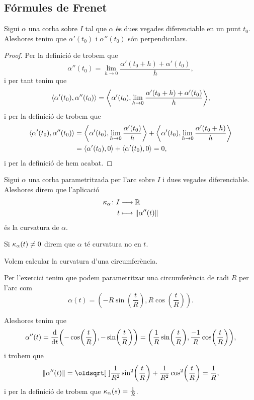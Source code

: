 \documentclass[../Apunts.tex]{subfiles}
\begin{document}
	\subsection{Fórmules de Frenet}
	\begin{proposition}
		\label{prop:la primera derivada i la segona derivada d'una corba són perpendiculars}
		Sigui \(\alpha\) una corba sobre \(I\) tal que \(\alpha\) és dues vegades diferenciable en un punt \(t_{0}\). Aleshores tenim que \(\alpha'(t_{0})\) i \(\alpha''(t_{0})\) són perpendiculars.
		\begin{proof}
			Per la definició de  trobem que
			\[\alpha''(t_{0})=\lim_{h\to0}\frac{\alpha'(t_{0}+h)+\alpha'(t_{0})}{h},\]
			i per tant tenim que
			\[\prodesc{\alpha'(t_{0})}{\alpha''(t_{0})}=\prodesc[\Big]{\alpha'(t_{0})}{\lim_{h\to0}\frac{\alpha'(t_{0}+h)+\alpha'(t_{0})}{h}},\]
			i per la definició de  trobem que
			\begin{align*}
				\prodesc{\alpha'(t_{0})}{\alpha''(t_{0})}	&=\prodesc[\big]{\alpha'(t_{0})}{\lim_{h\to0}\frac{\alpha'(t_{0})}{h}}+\prodesc[\big]{\alpha'(t_{0})}{\lim_{h\to0}\frac{\alpha'(t_{0}+h)}{h}} \\
				&=\prodesc{\alpha'(t_{0})}{0}+\prodesc{\alpha'(t_{0})}{0}=0,
			\end{align*}
			i per la definició de  hem acabat.
		\end{proof}
	\end{proposition}
	\begin{definition}[Curvatura]
		\label{def:curvatura}
		Sigui \(\alpha\) una corba parametritzada per l'arc sobre \(I\) i dues vegades diferenciable. Aleshores direm que l'aplicació
		\begin{align*}
			\curvatura_{\alpha}\colon I&\longrightarrow\mathbb{R} \\
			t&\longmapsto\norm{\alpha''(t)}
		\end{align*}
		és la curvatura de \(\alpha\).
		
		Si \(\operatorname{\kappa}_{\alpha}(t)\neq0\) direm que \(\alpha\) té curvatura no \nulla{} en \(t\).
	\end{definition}
	\begin{example}
		\label{ex:curvatura de la circumferència}
		Volem calcular la curvatura d'una circumferència.%
		\begin{solution}
			Per l'exercici  tenim que podem parametritzar una circumferència de radi \(R\) per l'arc com
			\[\alpha(t)=\left(-R\sin\left(\frac{t}{R}\right),R\cos\left(\frac{t}{R}\right)\right).\]
			
			Aleshores tenim que
			\[\alpha''(t)=\frac{\diff}{\diff t}\left(-\cos\left(\frac{t}{R}\right),-\sin\left(\frac{t}{R}\right)\right)=\left(\frac{1}{R}\sin\left(\frac{t}{R}\right),\frac{-1}{R}\cos\left(\frac{t}{R}\right)\right),\]
			i trobem que
			\[\norm{\alpha''(t)}=\sqrt{\frac{1}{R^{2}}\sin^{2}\left(\frac{t}{R}\right)+\frac{1}{R^{2}}\cos^{2}\left(\frac{t}{R}\right)}=\frac{1}{R},\]
			i per la definició de  trobem que \(\operatorname{\kappa}_{\alpha}(s)=\frac{1}{R}\).
		\end{solution}
	\end{example}
\end{document}

